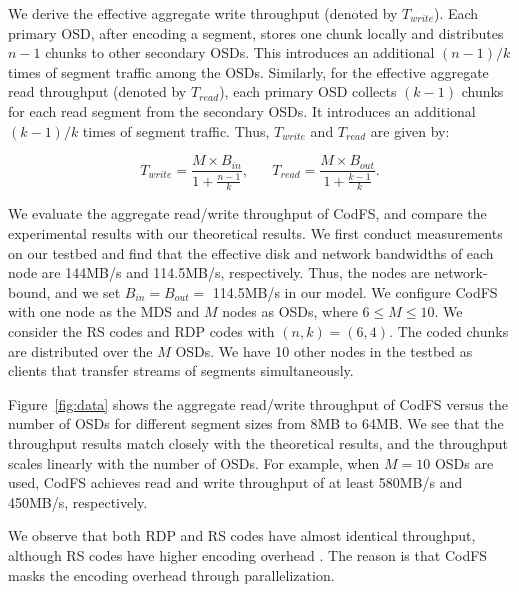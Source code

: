 We derive the effective aggregate write throughput (denoted by
$T_{write}$).  Each primary OSD, after encoding a segment, stores one chunk
locally and distributes $n-1$ chunks to other secondary OSDs.  This introduces
an additional $(n-1)/k$ times of segment traffic among the OSDs.
Similarly, for the effective aggregate read throughput (denoted by
$T_{read}$), each primary OSD collects $(k-1)$ chunks for each read segment
from the secondary OSDs. It introduces an additional $(k-1)/k$ times of segment
traffic.  Thus, $T_{write}$ and $T_{read}$ are given by: 

\vspace{-5pt}
\begin{equation*}
    T_{write} = \frac{M\times B_{in}}{1+\frac{n-1}{k}} , \hspace{20pt}
    T_{read} = \frac {M\times B_{out}}{1+\frac{k-1}{k}}.
\end{equation*}


We evaluate the aggregate read/write throughput of CodFS, and compare the
experimental results with our theoretical results.  We first conduct
measurements on our testbed and find that the effective disk and network
bandwidths of each node are 144MB/s and 114.5MB/s, respectively.  Thus,
the nodes are network-bound, and we set $B_{in}\!=\!B_{out}\!=$ 114.5MB/s in
our model.  We configure CodFS with one node as the MDS and $M$ nodes as OSDs,
where $6\!\le\!M\!\le\!10$.  We consider the RS codes and RDP
codes with $(n,k) = (6,4)$.  The coded chunks are distributed
over the $M$ OSDs.  We
have 10 other nodes in the testbed as clients that transfer streams of
segments simultaneously. 

Figure~\ref{fig:data} shows the aggregate read/write throughput of CodFS
versus the number of OSDs for different segment sizes from 8MB to 64MB. We see
that the throughput results match closely with the theoretical results, and the
throughput scales linearly with the number of OSDs.  For example, when $M=10$
OSDs are used, CodFS achieves read and write throughput of at least 580MB/s
and 450MB/s, respectively.  

We observe that both RDP and RS codes have almost identical throughput, although
RS codes have higher encoding overhead \cite{plank09}.  The reason is that CodFS
masks the encoding overhead through parallelization. 

